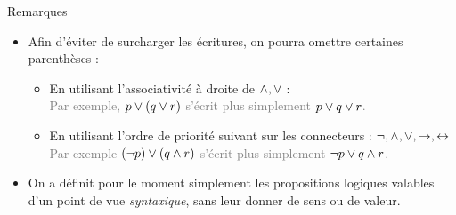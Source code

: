 \documentclass[10pt]{beamer}
\begin{document}
\begin{frame}{\Ctitle}{\stitle}
    \begin{block}{Remarques}
        \begin{itemize}
            \item Afin d'éviter de surcharger les écritures, on pourra omettre certaines parenthèses :
            \begin{itemize}
                \item<2-> En utilisant l'associativité à droite de $\wedge, \vee$ : \\
                 \textcolor{gray}{Par exemple, $p \vee (q \vee r)$ s'écrit plus simplement $p \vee q \vee r$.}
                \item<4-> En utilisant l'ordre de priorité suivant sur les connecteurs : $\neg, \wedge, \vee, \to, \leftrightarrow$ \\
                 \textcolor{gray}{Par exemple $ (\neg p) \vee (q \wedge r)$ s'écrit plus simplement $\neg p \vee q \wedge r$.}
            \end{itemize}
            \item On a définit pour le moment simplement les propositions logiques valables d'un point de vue \textit{syntaxique}, sans leur donner de sens ou de valeur.
        \end{itemize}
    \end{block}
\end{frame}
\end{document}
